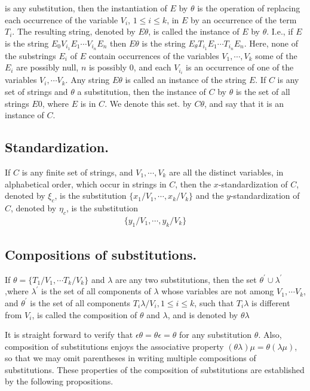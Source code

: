 \documentclass[8pt]{extarticle}
\begin{document}
is any substitution, then the instantiation of $E$ by $\theta$ is the operation of replacing each occurrence of the variable $V_i$, $1 \leq i \leq k$, in $E$ by an occurrence of the term $T_i$. The resulting string, denoted by $E\theta$, is called the instance of $E$ by $\theta$. I.e., if $E$ is the string $E_0V_{i_1}E_1 \dotsm V_{i_n}E_n$ then $E\theta$ is the string $E_\theta T_{i_1}E_1\dotsm T_{i_n}E_n$. Here, none of the substrings $E_i$ of $E$ contain occurrences of the variables $V_1, \dotsm , V_k$ some of the $E_i$ are possibly null, $n$ is possibly $0$, and each $V_{i_i}$ is an occurrence of one of the variables $V_i,\dotsm V_k$. Any string $E\theta$ is called an instance of the
string $E$. If $C$ is any set of strings and $\theta$ a substitution, then the instance of $C$ by $\theta$ is the set of all strings $E0$, where $E$ is in $C$. We denote this set. by $C\theta$, and say that it is an instance of $C$.

\subsection{Standardization.}

If $C$ is any finite set of strings, and $V_1, \dotsm , V_k$ are
all the distinct variables, in alphabetical order, which occur in strings in $C$, then
the $x$-standardization of $C$, denoted by $\xi_c$, is the substitution
$\{x_1/V_1,\dotsm,x_k/V_k\}$
and the $y$-standardization of $C$, denoted by $\eta_c$, is the substitution
\begin{align*}
    \{y_1/V_1,\dotsm,y_k/V_k\}
\end{align*}

\subsection{Compositions of substitutions.}

If $\theta = \{T_1/V_1,\dotsm T_k/V_k\}$ and $\lambda$ are any
two substitutions, then the set $\theta^\prime \cup \lambda^\prime$ ,where $\lambda^\prime$ is the set of all components of $\lambda$
whose variables are not among $V_1,\dotsm V_k$, and $\theta^\prime$ is the set of all components
$T_i\lambda/V_i, 1 \leq i \leq k$, such that $T_i\lambda$ is different from $V_i$, is called the composition of $\theta$ and $\lambda$, and is denoted by $\theta\lambda$

It is straight forward to verify that $\epsilon\theta = \theta\epsilon = \theta$ for any substitution $\theta$. Also,
composition of substitutions enjoys the associative property $(\theta\lambda)\mu = \theta(\lambda\mu)$, so
that we may omit parentheses in writing multiple compositions of substitutions. 
These properties of the composition of substitutions are established by the following propositions.
\end{document}

